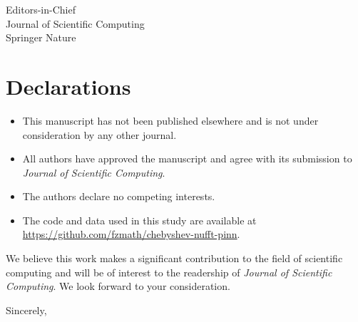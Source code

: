\documentclass[12pt]{letter}
\begin{document}
\begin{letter}{
  Editors-in-Chief\\
  Journal of Scientific Computing\\
  Springer Nature
}
\section*{Declarations}

\begin{itemize}
  \item This manuscript has not been published elsewhere and is not under consideration by any other journal.
  \item All authors have approved the manuscript and agree with its submission to \textit{Journal of Scientific Computing}.
  \item The authors declare no competing interests.
  \item The code and data used in this study are available at \url{https://github.com/fzmath/chebyshev-nufft-pinn}.
\end{itemize}

We believe this work makes a significant contribution to the field of scientific computing and will be of interest to the readership of \textit{Journal of Scientific Computing}. We look forward to your consideration.

\closing{Sincerely,}

\end{letter}
\end{document}
